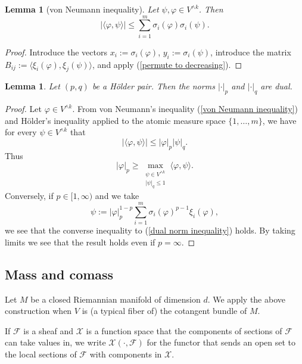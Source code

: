 \documentclass[reqno,11pt]{amsart}
\newtheorem{lemma}[theorem]{Lemma}
\theoremstyle{definition}
\numberwithin{equation}{section}
\begin{document}
\begin{lemma}[von Neumann inequality]
Let $\psi, \varphi \in V^{\wedge k}$.
Then
\begin{equation}\label{von Neumann inequality}
|\langle \varphi, \psi\rangle| \leq \sum_{i=1}^m \sigma_i(\varphi) \sigma_i(\psi).
\end{equation}
\end{lemma}
\begin{proof}
Introduce the vectors $x_i := \sigma_i(\varphi)$, $y_i := \sigma_i(\psi)$, introduce the matrix $B_{ij} := \langle \xi_i(\varphi), \xi_j(\psi)\rangle$, and apply (\ref{permute to decreasing}).
\end{proof}

\begin{lemma}
Let $(p, q)$ be a H\"older pair. Then the norms $|\cdot|_p$ and $|\cdot|_q$ are dual.
\end{lemma}
\begin{proof}
Let $\varphi \in V^{\wedge k}$.
From von Neumann's inequality (\ref{von Neumann inequality}) and H\"older's inequality applied to the atomic measure space $\{1, \dots, m\}$, we have for every $\psi \in V^{\wedge k}$ that
$$|\langle \varphi, \psi\rangle| \leq |\varphi|_p |\psi|_q.$$
Thus 
\begin{equation}\label{dual norm inequality}
|\varphi|_p \geq \max_{\substack{\psi \in V^{\wedge k} \\ |\psi|_q \leq 1}} \langle \varphi, \psi\rangle.
\end{equation}
Conversely, if $p \in [1, \infty)$ and we take
$$\psi := |\varphi|_p^{1 - p} \sum_{i=1}^m \sigma_i(\varphi)^{p - 1} \xi_i(\varphi),$$
we see that the converse inequality to (\ref{dual norm inequality}) holds.
By taking limits we see that the result holds even if $p = \infty$.
\end{proof}

\subsection{Mass and comass}
Let $M$ be a closed Riemannian manifold of dimension $d$.
We apply the above construction when $V$ is (a typical fiber of) the cotangent bundle of $M$.

If $\mathscr F$ is a sheaf and $\mathcal X$ is a function space that the components of sections of $\mathscr F$ can take values in, we write $\mathcal X(\cdot, \mathscr F)$ for the functor that sends an open set to the local sections of $\mathscr F$ with components in $\mathcal X$.
\end{document}
